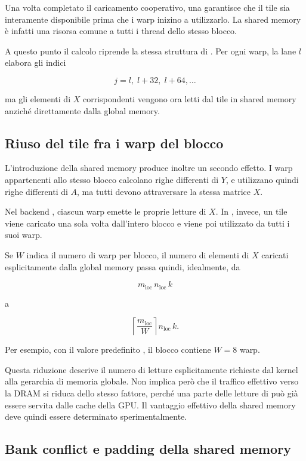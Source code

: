 Una volta completato il caricamento cooperativo, una
 garantisce che il tile sia interamente disponibile
prima che i warp inizino a utilizzarlo. La shared memory è infatti una
risorsa comune a tutti i thread dello stesso blocco.

A questo punto il calcolo riprende la stessa struttura di
. Per ogni warp, la lane $l$ elabora gli indici

\[
j=l,\;l+32,\;l+64,\ldots
\]

ma gli elementi di $X$ corrispondenti vengono ora letti dal tile in shared
memory anziché direttamente dalla global memory.

\subsection{Riuso del tile fra i warp del blocco}

L'introduzione della shared memory produce inoltre un secondo effetto.
I warp appartenenti allo stesso blocco calcolano righe differenti di $Y$,
e utilizzano quindi righe differenti di $A$, ma tutti devono attraversare
la stessa matrice $X$.

Nel backend , ciascun warp emette le proprie letture
di $X$. In , invece, un tile viene caricato una
sola volta dall'intero blocco e viene poi utilizzato da tutti i suoi warp.

Se $W$ indica il numero di warp per blocco, il numero di elementi di $X$
caricati esplicitamente dalla global memory passa quindi, idealmente, da

\[
m_{\mathrm{loc}}\,n_{\mathrm{loc}}\,k
\]

a

\[
\left\lceil\frac{m_{\mathrm{loc}}}{W}\right\rceil
n_{\mathrm{loc}}\,k.
\]

Per esempio, con il valore predefinito , il blocco contiene
$W=8$ warp.

Questa riduzione descrive il numero di letture esplicitamente richieste
dal kernel alla gerarchia di memoria globale. Non implica però che il
traffico effettivo verso la DRAM si riduca dello stesso fattore, perché
una parte delle letture di  può già essere servita
dalle cache della GPU. Il vantaggio effettivo della shared memory deve
quindi essere determinato sperimentalmente.

\subsection{Bank conflict e padding della shared memory}
\label{sec:bank-conflict}

